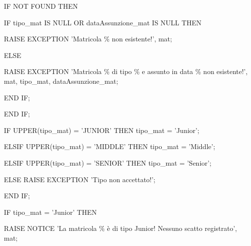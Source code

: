 \begin{flushleft}
\begin{description}
\begin{description}
                        \item IF NOT FOUND THEN
                        \begin{description}
                            \item IF tipo\_mat IS NULL OR dataAssunzione\_mat IS NULL THEN
                            \begin{description}
                                \item RAISE EXCEPTION 'Matricola \% non esistente!', mat;
                            \end{description}
                            \item ELSE
                            \begin{description}
                                \item RAISE EXCEPTION 'Matricola \% di tipo \% e assunto in data \% non esistente!', mat, tipo\_mat, dataAssunzione\_mat;
                            \end{description}
                            \item END IF;
                        \end{description}
                        \item END IF;
                        \vspace{0.5cm}
                        \item IF UPPER(tipo\_mat) = 'JUNIOR' THEN tipo\_mat = 'Junior';
                        \item ELSIF UPPER(tipo\_mat) = 'MIDDLE' THEN tipo\_mat = 'Middle';
                        \item ELSIF UPPER(tipo\_mat) = 'SENIOR' THEN tipo\_mat = 'Senior';
                        \item ELSE RAISE EXCEPTION 'Tipo non accettato!';
                        \item END IF;
                        
                        \vspace{0.5cm}

                        \item IF tipo\_mat = 'Junior' THEN
                        \begin{description}
                            \item RAISE NOTICE 'La matricola \% è di tipo Junior! Nessuno scatto registrato', mat;
                        \end{description}


\end{description}
\end{description}
\end{flushleft}
